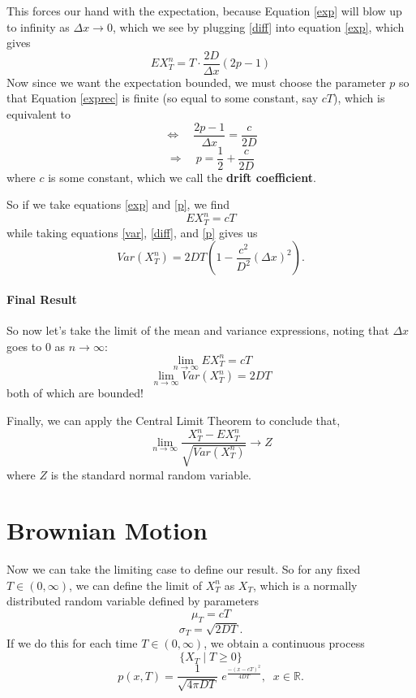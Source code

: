 \documentclass[a4paper,12pt]{scrartcl}
\begin{document}
This forces our hand with the expectation, because Equation \ref{exp} will blow up to
infinity as $\Delta x \rightarrow 0$, which we see by plugging 
\ref{diff} into equation \ref{exp}, which gives 
\begin{equation}
    \label{exprec}
    EX^n_T = T \cdot \frac{ 2D}{\Delta x} (2p-1)
\end{equation}
Now since we want the expectation bounded, we must choose the parameter $p$
so that Equation \ref{exprec} is finite (so equal to some constant, say $cT$),
which is equivalent to
   \[ \Leftrightarrow \quad \frac{2p - 1}{\Delta x} = \frac{c}{2D} \]
\begin{equation}
   \label{p}
   \Rightarrow \quad p = \frac{1}{2} + \frac{c}{2D} 
\end{equation}
where $c$ is some constant, which we call the \textbf{drift coefficient}. 

So if we take equations \ref{exp} and \ref{p}, we find
   \[ EX^n_T = cT \]
while taking equations \ref{var}, \ref{diff}, and \ref{p} gives us
   \[ Var(X^n_T)= 2DT \left( 1 - \frac{c^2}{D^2} (\Delta x)^2 \right).\]

\paragraph{Final Result} So now let's take the limit of the mean and 
variance expressions, noting that $\Delta x$ goes to $0$ as 
$n\rightarrow \infty$:
   \[ \lim_{n\rightarrow \infty} EX^n_T = cT  \]
   \[ \lim_{n\rightarrow \infty} Var(X^n_T)= 2DT  \]
both of which are bounded! 

Finally, we can apply the Central Limit Theorem to conclude that, 
   \[\lim_{n \rightarrow \infty} \frac{X^n_T - 
      EX^n_T}{\sqrt{Var(X^n_T)}} \rightarrow Z \]
where $Z$ is the standard normal random variable. 

\section{Brownian Motion} 

Now we can take the limiting case to define our result. So for any fixed 
$ T \in (0,\infty)$, we can define the limit of $X^n_T$ as $X_T$, which
is a normally distributed random variable defined by parameters
   \[ \mu_T = cT \]
   \[ \sigma_T = \sqrt{2DT}.\]
If we do this for each time $T \in (0,\infty)$, we obtain a 
continuous process 
   \[ \{ X_T \; |\; T \geq 0 \}  \]
   \[p(x,T) = \frac{1}{\sqrt{4\pi DT}} \;
      e^{\frac{-(x - cT)^2}{4DT}}, \;\; x \in \mathbb{R}.\]
\end{document}
